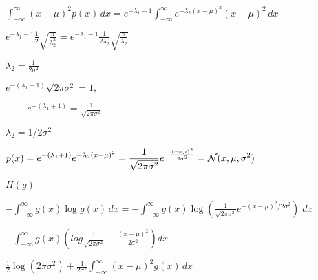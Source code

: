 \documentclass{article}
\def\lthtmlcheckvsize{\ifdim\ht\sizebox<\vsize 
  \ifdim\wd\sizebox<\hsize\expandafter\hfill\fi \expandafter\vfill
  \else\expandafter\vss\fi}%
\begin{document}
{\newpage\clearpage
{}%
$\displaystyle \int^\infty_{-\infty} (x-\mu)^2p(x)\,dx
=e^{-\lambda_1-1}\int^\infty_{-\infty} e^{-\lambda_2(x-\mu)^2}(x-\mu)^2\,dx$%
\lthtmlindisplaymathZ
\lthtmlcheckvsize\clearpage}

{\newpage\clearpage
{}%
$\displaystyle e^{-\lambda_1-1}\frac{1}{2}\sqrt{\frac{\pi}{\lambda_2^3}}
=e^{-\lambda_1-1}\frac{1}{2\lambda_2}\sqrt{\frac{\pi}{\lambda_2}}$%
\lthtmlindisplaymathZ
\lthtmlcheckvsize\clearpage}

{\newpage\clearpage
{}%
$\displaystyle \lambda_2=\frac{1}{2\sigma^2}$%
\lthtmlindisplaymathZ
\lthtmlcheckvsize\clearpage}

{\newpage\clearpage
{}%
$\displaystyle e^{-(\lambda_1+1)}\sqrt{2\pi\sigma^2}=1,\;\;\;\;\;\;\;\;$%
\lthtmlindisplaymathZ
\lthtmlcheckvsize\clearpage}

{\newpage\clearpage
{}%
$\displaystyle \;\;\;\;\;\;\;\;
e^{-(\lambda_1+1)}=\frac{1}{\sqrt{2\pi\sigma^2}}$%
\lthtmlindisplaymathZ
\lthtmlcheckvsize\clearpage}

{\newpage\clearpage
{}%
$ \lambda_2=1/2\sigma^2$%
\lthtmlindisplaymathZ
\lthtmlcheckvsize\clearpage}

{\newpage\clearpage
{}%
$\displaystyle p(x)=e^{-(\lambda_1+1)} e^{-\lambda_2(x-\mu)^2}
=\frac{1}{\sqrt{2\pi\sigma^2}}e^{-\frac{(x-\mu)^2}{2\sigma^2}}
={\cal N}(x,\mu,\sigma^2)$%
\lthtmlindisplaymathZ
\lthtmlcheckvsize\clearpage}

{\newpage\clearpage
{}%
$\displaystyle H(g)$%
\lthtmlindisplaymathZ
\lthtmlcheckvsize\clearpage}

{\newpage\clearpage
{}%
$\displaystyle -\int^\infty_{-\infty} g(x)\log g(x)\,dx
=-\int^\infty_{-\infty} g(x)\log \left(\frac{1}{\sqrt{2\pi\sigma^2}}e^{-(x-\mu)^2/2\sigma^2} \right) \;dx$%
\lthtmlindisplaymathZ
\lthtmlcheckvsize\clearpage}

{\newpage\clearpage
{}%
$\displaystyle -\int^\infty_{-\infty} g(x)\left(log\frac{1}{\sqrt{2\pi\sigma^2}}-\frac{(x-\mu)^2}{2\sigma^2}\right)dx$%
\lthtmlindisplaymathZ
\lthtmlcheckvsize\clearpage}

{\newpage\clearpage
{}%
$\displaystyle \frac{1}{2}\log(2\pi\sigma^2)+\frac{1}{2\sigma^2}\int^\infty_{-\infty}(x-\mu)^2 g(x)\,dx$%
\lthtmlindisplaymathZ
\lthtmlcheckvsize\clearpage}
\end{document}
